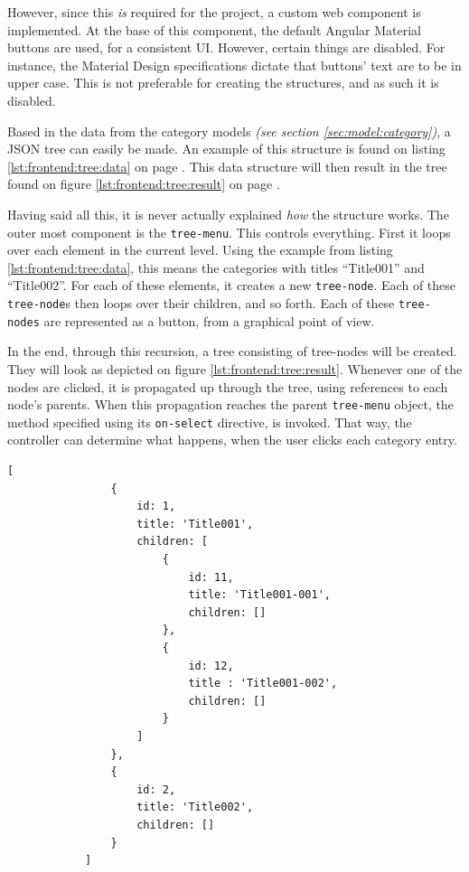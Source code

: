 		However, since this \emph{is} required for the project, a custom web component is implemented. At the base of this component, the default Angular Material buttons are used, for a consistent UI. However, certain things are disabled. For instance, the Material Design specifications dictate that buttons' text are to be in upper case. This is not preferable for creating the structures, and as such it is disabled.

		Based in the data from the category models \emph{(see section \ref{sec:model:category})}, a JSON tree can easily be made. An example of this structure is found on listing \ref{lst:frontend:tree:data} on page \pageref{lst:frontend:tree:data}. This data structure will then result in the tree found on figure \ref{lst:frontend:tree:result} on page \pageref{lst:frontend:tree:result}.

		Having said all this, it is never actually explained \emph{how} the structure works. The outer most component is the \verb=tree-menu=. This controls everything. First it loops over each element in the current level. Using the example from listing \ref{lst:frontend:tree:data}, this means the categories with titles ``Title001'' and ``Title002''. For each of these elements, it creates a new \verb=tree-node=. Each of these \verb=tree-node=s then loops over their children, and so forth. Each of these \verb=tree-nodes= are represented as a button, from a graphical point of view.

		In the end, through this recursion, a tree consisting of tree-nodes will be created. They will look as depicted on figure \ref{lst:frontend:tree:result}. Whenever one of the nodes are clicked, it is propagated up through the tree, using references to each node's parents. When this propagation reaches the parent \verb=tree-menu= object, the method specified using its \verb=on-select= directive, is invoked. That way, the controller can determine what happens, when the user clicks each category entry.


		\begin{lstlisting}[style=json2,gobble=12, caption={The front-end's category tree data structure},label={lst:frontend:tree:data}]
            [
                {
                    id: 1,
                    title: 'Title001',
                    children: [
                        {
                            id: 11,
                            title: 'Title001-001',
                            children: []
                        },
                        {
                            id: 12,
                            title : 'Title001-002',
                            children: []
                        }
                    ]
                },
                {
                    id: 2,
                    title: 'Title002',
                    children: []
                }
            ]
		\end{lstlisting}
	

